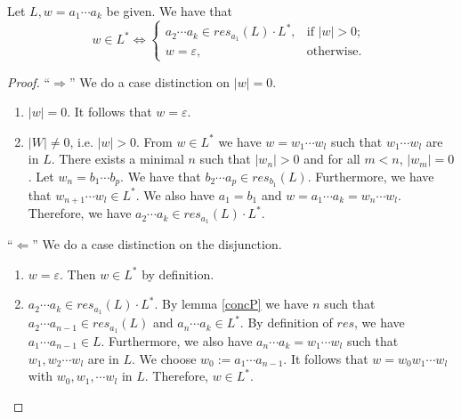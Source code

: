     \begin{lemma}
        \label{starP}
        Let $L, w = a_1 \cdots a_k$ be given. We have that
        \begin{equation*}
            w \in L^*   
            \iff
                \left\{
                    \begin{array}{ll}
                         a_2 \cdots a_k \in res_{a_1}(L) \cdot L^*, & \mbox{if } |w| > 0; \\
                         w = \varepsilon, & \mbox{otherwise. }
                    \end{array}
                \right.
        \end{equation*}
    \end{lemma}
    \begin{proof}
        ``$\Rightarrow$'' 
        We do a case distinction on $|w| = 0$.
        \begin{enumerate}
            \item
                $|w| = 0$. It follows that $w = \varepsilon$.
            \item
                $|W| \neq 0$, i.e. $|w| > 0$.
                From $w \in L^*$ we have $w = w_1 \cdots w_l$ such that $w_1 \cdots w_l$ are in $L$.
                There exists a minimal $n$ such that $|w_n| > 0$ and for all $m < n$, $|w_m| = 0$.
                Let $w_n = b_1 \cdots b_p$. We have that $b_2 \cdots a_p \in res_{b_1}(L)$.
                Furthermore, we have that $w_{n+1} \cdots w_l \in L^*$.
                We also have $a_1 = b_1$ and $w = a_1 \cdots a_k = w_n \cdots w_l$. 
                Therefore, we have $a_2 \cdots a_k \in res_{a_1}(L) \cdot L^*$.
        \end{enumerate}
        ``$\Leftarrow$'' 
        We do a case distinction on the disjunction.
        \begin{enumerate}
            \item
                $w = \varepsilon$. Then $w \in L^*$ by definition.
            \item
                $a_2 \cdots a_k \in res_{a_1}(L) \cdot L^*$. 
                By lemma \ref{concP} we have $n$ such that $a_2 \cdots a_{n-1} \in res_{a_1}(L)$ and $a_n \cdots a_k \in L^*$.
                By definition of $res$, we have $a_1 \cdots a_{n-1} \in L$.
                Furthermore, we also have $a_n \cdots a_k = w_1 \cdots w_l$ such that $w_1, w_2 \cdots w_l$ are in $L$.
                We choose $w_0 := a_1 \cdots a_{n-1}$.
                It follows that $w = w_0 w_1 \cdots w_l$ with $w_0, w_1, \cdots w_l$ in $L$.
                Therefore, $w \in L^*$.
        \end{enumerate}
    \end{proof}

